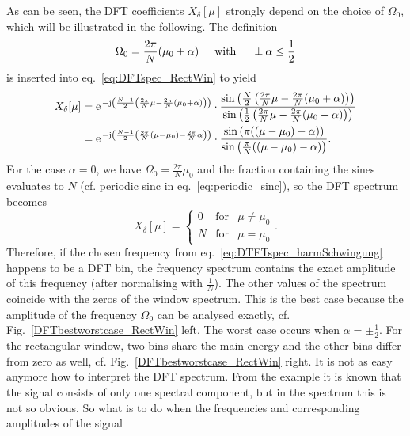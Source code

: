 \documentclass[11pt,a4paper,DIV=12]{scrartcl}
\begin{document}
%
As can be seen, the DFT coefficients $X_\delta[\mu]$ strongly depend on
the choice of $\Omega_0$, which will be illustrated in the following.
%
The definition
%
\begin{equation}
\Omega_0=\frac{2\pi}{N}(\mu_0+\alpha)
\hspace{5mm} \text{with} \hspace{5mm}
\pm\alpha\leq\frac{1}{2}
\end{equation}
%
is inserted into eq.~\eqref{eq:DFTspec_RectWin} to yield
%
\begin{align}
X_\delta[\mu]&=\e^{-\im\left(\frac{N-1}{2}\left(\frac{2\pi}{N}\mu-\frac{2\pi}{N}(\mu_0+\alpha)\right)\right)}\cdot\frac{\sin\left(\frac{N}{2}\left(\frac{2\pi}{N}\mu-\frac{2\pi}{N}(\mu_0+\alpha)\right)\right)}{\sin\left(\frac{1}{2}\left(\frac{2\pi}{N}\mu-\frac{2\pi}{N}(\mu_0+\alpha)\right)\right)}\\
&=\e^{-\im\left(\frac{N-1}{2}\left(\frac{2\pi}{N}(\mu-\mu_0)-\frac{2\pi}{N}\alpha\right)\right)}\cdot\frac{\sin\left(\pi((\mu-\mu_0)-\alpha)\right)}{\sin\left(\frac{\pi}{N}((\mu-\mu_0)-\alpha)\right)}.
\label{eq:DFTspec_mitalpha}
\end{align}
%
For the case $\alpha=0$, we have $\Omega_0=\frac{2\pi}{N}\mu_0$ and the fraction
containing the sines evaluates to $N$ (cf. periodic sinc in
eq.~\eqref{eq:periodic_sinc}), so the DFT spectrum becomes
%
\begin{equation}
X_\delta[\mu]=\left\{\begin{matrix}0 & \text{for} & \mu\neq\mu_0\\N & \text{for} & \mu=\mu_0\end{matrix}\right..
\end{equation}
%
Therefore, if the chosen frequency from eq.~\eqref{eq:DTFTspec_harmSchwingung}
happens to be a DFT bin, the frequency spectrum contains the exact amplitude of
this frequency (after normalising with $\frac{1}{N}$).
%
The other values of the spectrum coincide with the zeros of the window spectrum.
%
This is the best case because the amplitude of the frequency $\Omega_0$ can be
analysed exactly, cf. Fig.~\ref{DFTbestworstcase_RectWin} left.
%
The worst case occurs when $\alpha=\pm\frac{1}{2}$.
%
For the rectangular window, two bins share the main energy and the other bins
differ from zero as well, cf. Fig.~\ref{DFTbestworstcase_RectWin} right.
%
It is not as easy anymore how to interpret the DFT spectrum.
%
From the example it is known that the signal consists of only one spectral
component, but in the spectrum this is not so obvious.
%
So what is to do when the frequencies and corresponding amplitudes of the signal
\end{document}
